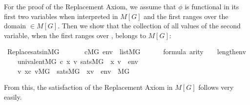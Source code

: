 For the proof of the Replacement Axiom, we assume that $\phi$ is
functional in its first two variables when interpreted in $M[G]$ and
the first ranges over the domain ${}\in M[G]$. Then we show
that the collection of
all values of the second variable, when the first ranges over
, belongs to $M[G]$:
%
\begin{isabelle}
\isamarkupfalse%
\ Replace{\isacharunderscore}sats{\isacharunderscore}in{\isacharunderscore}MG{\isacharcolon}\isanewline
\ \ \isanewline
\ \ \ \ {\isachardoublequoteopen}c{\isasymin}M{\isacharbrackleft}G{\isacharbrackright}{\isachardoublequoteclose}\ {\isachardoublequoteopen}env\ {\isasymin}\ list{\isacharparenleft}M{\isacharbrackleft}G{\isacharbrackright}{\isacharparenright}{\isachardoublequoteclose}\isanewline
\ \ \ \ {\isachardoublequoteopen}{\isasymphi}\ {\isasymin}\ formula{\isachardoublequoteclose}\ {\isachardoublequoteopen}arity{\isacharparenleft}{\isasymphi}{\isacharparenright}\ {\isasymle}\ {}\ {\isacharhash}{\isacharplus}\ length{\isacharparenleft}env{\isacharparenright}{\isachardoublequoteclose}\isanewline
\ \ \ \ {\isachardoublequoteopen}univalent{\isacharparenleft}{\isacharhash}{\isacharhash}M{\isacharbrackleft}G{\isacharbrackright}{\isacharcomma}\ c{\isacharcomma}\ {\isasymlambda}x\ v{\isachardot}\ sats{\isacharparenleft}M{\isacharbrackleft}G{\isacharbrackright}{\isacharcomma}\ {\isasymphi}{\isacharcomma}\ {\isacharbrackleft}x{\isacharcomma}\ v{\isacharbrackright}\ {\isacharat}\ env{\isacharparenright}{\isacharparenright}{\isachardoublequoteclose}\isanewline
\ \ \isanewline
\ \ \ \ {\isachardoublequoteopen}{\isacharbraceleft}v{\isachardot}\ x{\isasymin}c{\isacharcomma}\ v{\isasymin}M{\isacharbrackleft}G{\isacharbrackright}\ {\isasymand}\ sats{\isacharparenleft}M{\isacharbrackleft}G{\isacharbrackright}{\isacharcomma}\ {\isasymphi}{\isacharcomma}\ {\isacharbrackleft}x{\isacharcomma}v{\isacharbrackright}\ {\isacharat}\ env{\isacharparenright}{\isacharbraceright}\ {\isasymin}\ M{\isacharbrackleft}G{\isacharbrackright}{\isachardoublequoteclose}
\end{isabelle}
%
From this, the satisfaction of the Replacement Axiom in $M[G]$ follows
very easily.

